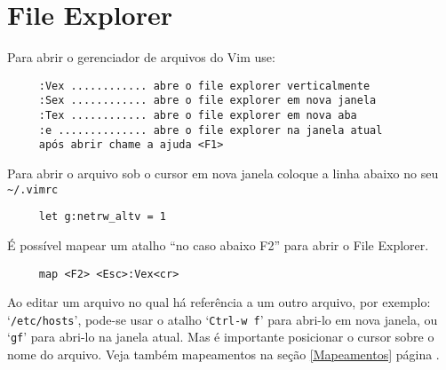 \section{File Explorer }
\label{File Explorer }
Para abrir o gerenciador de arquivos do Vim use:

\begin{verbatim}
     :Vex ............ abre o file explorer verticalmente
     :Sex ............ abre o file explorer em nova janela
     :Tex ............ abre o file explorer em nova aba
     :e .............. abre o file explorer na janela atual
     após abrir chame a ajuda <F1>
\end{verbatim}

Para abrir o arquivo sob o cursor em nova janela coloque a linha abaixo no seu \verb|~/.vimrc|

\begin{verbatim}
     let g:netrw_altv = 1
\end{verbatim}

É possível mapear um atalho ``no caso abaixo F2'' para abrir o File Explorer.

\begin{verbatim}
     map <F2> <Esc>:Vex<cr>
\end{verbatim}


{\Large {}} Ao editar um arquivo no qual há referência a um outro
arquivo, por exemplo: `{\tt /etc/hosts}', pode-se usar o atalho `{\tt Ctrl-w
f}' para abri-lo em nova janela, ou `{\tt gf}' para abri-lo na janela atual.
Mas é importante posicionar o cursor sobre o nome do arquivo.  Veja também
mapeamentos na seção \ref{Mapeamentos} página \pageref{Mapeamentos}.
